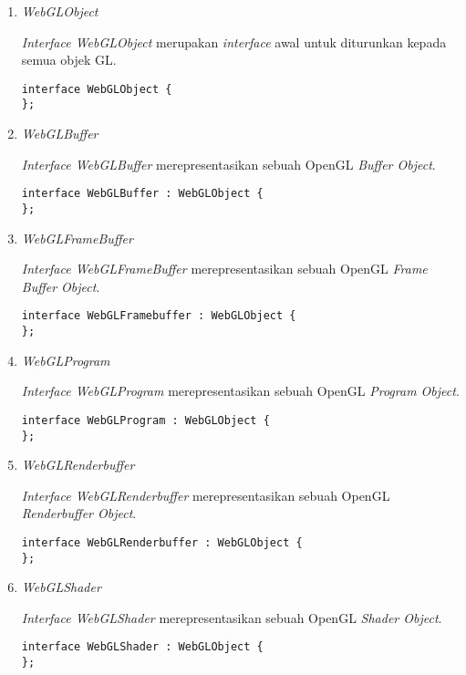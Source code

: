 \begin{enumerate}
\begin{itemize}
	\end{itemize}
	
\item {\it WebGLObject}

	{\it Interface WebGLObject} merupakan {\it interface} awal untuk diturunkan kepada semua objek GL.
	\begin{lstlisting}[caption={{\it Interface} awal pada WebGL.}, captionpos=b]
interface WebGLObject {
};
	\end{lstlisting}
	
\item {\it WebGLBuffer} 
	
	{\it Interface WebGLBuffer} merepresentasikan sebuah OpenGL {\it Buffer Object}.
	\begin{lstlisting}[caption={{\it Buffer Object} pada OpenGL.}, captionpos=b]
interface WebGLBuffer : WebGLObject {
};
	\end{lstlisting}
	
\item {\it WebGLFrameBuffer}

	{\it Interface WebGLFrameBuffer} merepresentasikan sebuah OpenGL {\it Frame Buffer Object}.
	\begin{lstlisting}[caption={{\it Frame Buffer Object} pada OpenGL.}, captionpos=b]
interface WebGLFramebuffer : WebGLObject {
};
	\end{lstlisting}

\item {\it WebGLProgram}

	{\it Interface WebGLProgram} merepresentasikan sebuah OpenGL {\it Program Object}.
	\begin{lstlisting}[caption={{\it Program Object} pada OpenGL.}, captionpos=b]
interface WebGLProgram : WebGLObject {
};
	\end{lstlisting}

\item {\it WebGLRenderbuffer}

	{\it Interface WebGLRenderbuffer} merepresentasikan sebuah OpenGL {\it Renderbuffer Object}.
	\begin{lstlisting}[caption={{\it Renderbuffer Object} pada OpenGL.}, captionpos=b]
interface WebGLRenderbuffer : WebGLObject {
};
	\end{lstlisting}

\item {\it WebGLShader}

	{\it Interface WebGLShader} merepresentasikan sebuah OpenGL {\it Shader Object}.
	\begin{lstlisting}[caption={{\it Shader Object} pada OpenGL.}, captionpos=b]
interface WebGLShader : WebGLObject {
};
	\end{lstlisting}


\end{enumerate}
